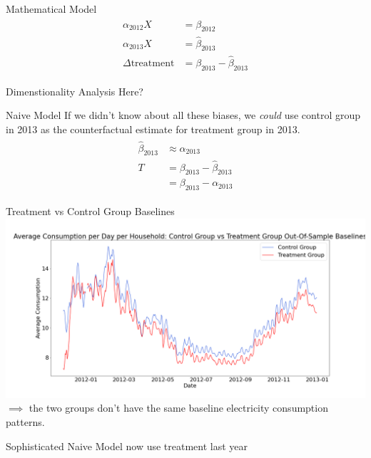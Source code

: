 \documentclass{beamer}
\begin{document}
\begin{frame}{Mathematical Model}
  \begin{align}
    \begin{split}
        \alpha_{2012} X &= \beta_{2012} \\
        \alpha_{2013} X &= \hat\beta_{2013} \\
        \Delta\mbox{treatment} &= \beta_{2013} - \hat\beta_{2013}
    \end{split}
  \end{align}
\end{frame}

\begin{frame}{Dimenstionality Analysis}
  Here?
\end{frame}

\begin{frame}{Naive Model}
  If we didn't know about all these biases, we \textit{could} use control group in 2013 as the counterfactual estimate for treatment group in 2013.
  \begin{align}
    \begin{split}
      \hat\beta_{2013} & \approx \alpha_{2013} \\
      T & = \beta_{2013} - \hat\beta_{2013} \\
        & = \beta_{2013} - \alpha_{2013}
    \end{split}
  \end{align}
\end{frame}

\begin{frame}{Treatment vs Control Group Baselines}
  \centering
  \includegraphics[width=1\textwidth]{images/avg-consumption-per-day-baseline.png}
  $\implies$ the two groups don't have the same baseline electricity consumption patterns.
\end{frame}

\begin{frame}{Sophisticated Naive Model}
  now use treatment last year
\end{frame}
\end{document}
